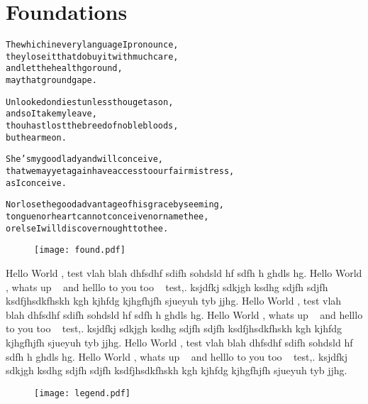 
\chapter{Foundations}
\label{ch:foundations}

\startcontents[chapters]

\vfill

\begin{alltt}\sffamily
The which in every language I pronounce,
they lose it that do buy it with much care,
and let the health go round,
may that ground gape.

Unlooked on diest unless thou get a son,
and so I take my leave,
thou hast lost the breed of noble bloods,
but hear me on.

She's my good lady and will conceive,  
that we may yet again have access to our fair mistress,
as I conceive.

Nor lose the good advantage of his grace by seeming,
tongue nor heart cannot conceive nor name thee,
or else I will discover nought to thee.
\end{alltt}

\newpage
\begin{figure}[!htbp]
\centering
  \texttt{[image: found.pdf]}
\end{figure}

\vfill

{\sffamily 
Hello World \intro, test vlah blah dhfsdhf sdifh sohdsld hf sdfh h ghdls hg. Hello World \intro, whats up \inspi~ and helllo to you too \appa~ test,. ksjdfkj sdkjgh  ksdhg sdjfh sdjfh ksdfjhsdkfhskh kgh kjhfdg kjhgfhjfh sjueyuh tyb jjhg.
Hello World \intro, test vlah blah dhfsdhf sdifh sohdsld hf sdfh h ghdls hg. Hello World \intro, whats up \inspi~ and helllo to you too \appa~ test,. ksjdfkj sdkjgh  ksdhg sdjfh sdjfh ksdfjhsdkfhskh kgh kjhfdg kjhgfhjfh sjueyuh tyb jjhg.
Hello World \intro, test vlah blah dhfsdhf sdifh sohdsld hf sdfh h ghdls hg. Hello World \intro, whats up \inspi~ and helllo to you too \appa~ test,. ksjdfkj sdkjgh  ksdhg sdjfh sdjfh ksdfjhsdkfhskh kgh kjhfdg kjhgfhjfh sjueyuh tyb jjhg.
}

\begin{figure}[!htbp]
\centering
  \texttt{[image: legend.pdf]}
\end{figure}

\newpage
\minicontents
\spirals


